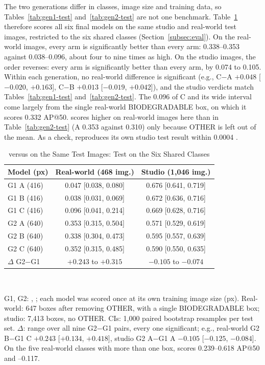 The two generations differ in classes, image size and training data, so Tables~\ref{tab:gen1-test} and~\ref{tab:gen2-test} are not one benchmark. Table~\ref{tab:g1g2} therefore scores all six final models on the same studio and real-world test images, restricted to the six shared classes (Section~\ref{subsec:eval}). On the real-world images, every \gentwo arm is significantly better than every \genone arm: 0.338--0.353 \mapfifty against 0.038--0.096, about four to nine times as high. On the studio images, the order reverses: every \genone arm is significantly better than every \gentwo arm, by 0.074 to 0.105. Within each generation, no real-world difference is significant (e.g., \genone C$-$A $+0.048$ [$-0.020$, $+0.163$], \gentwo C$-$B $+0.013$ [$-0.019$, $+0.042$]), and the studio verdicts match Tables~\ref{tab:gen1-test} and~\ref{tab:gen2-test}. The 0.096 of \genone C and its wide interval come largely from the single real-world BIODEGRADABLE box, on which it scores 0.332 AP@50. \gentwo scores higher on real-world images here than in Table~\ref{tab:gen2-test} (A 0.353 against 0.310) only because OTHER is left out of the mean. As a check, \genone reproduces its own studio test result within 0.0004 \mapfifty.

\begin{table}[!t]
\centering
\caption{\genone versus \gentwo on the Same Test Images: Test \mapfifty [95\% CI] on the Six Shared Classes}
\label{tab:g1g2}
\footnotesize
\begin{tabular}{@{}lcc@{}}
\toprule
Model (px) & Real-world (468 img.) & Studio (1,046 img.) \\
\midrule
G1 A (416) & 0.047 [0.038, 0.080] & 0.676 [0.641, 0.719] \\
G1 B (416) & 0.038 [0.031, 0.069] & 0.672 [0.636, 0.716] \\
G1 C (416) & 0.096 [0.041, 0.214] & 0.669 [0.628, 0.716] \\
\midrule
G2 A (640) & 0.353 [0.315, 0.504] & 0.571 [0.529, 0.619] \\
G2 B (640) & 0.338 [0.304, 0.473] & 0.595 [0.557, 0.639] \\
G2 C (640) & 0.352 [0.315, 0.485] & 0.590 [0.550, 0.635] \\
\midrule
$\Delta$ G2$-$G1 & $+0.243$ to $+0.315$ & $-0.105$ to $-0.074$ \\
\bottomrule
\end{tabular}
\\[2pt]
\parbox{\columnwidth}{\footnotesize G1, G2: \genone, \gentwo; each model was scored once at its own training image size (px). Real-world: 647 boxes after removing OTHER, with a single BIODEGRADABLE box; studio: 7,413 boxes, no OTHER. CIs: 1,000 paired bootstrap resamples per test set. $\Delta$: range over all nine G2$-$G1 pairs, every one significant; e.g., real-world G2 B$-$G1 C $+0.243$ [$+0.134$, $+0.418$], studio G2 A$-$G1 A $-0.105$ [$-0.125$, $-0.084$]. On the five real-world classes with more than one box, \gentwo scores 0.239--0.618 AP@50 and --0.117.}
\end{table}

